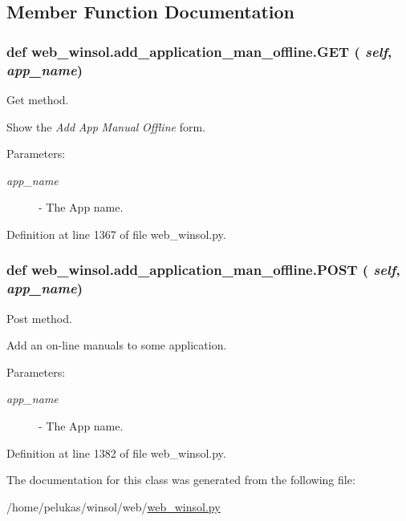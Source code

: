\subsection{Member Function Documentation}
\hypertarget{classweb__winsol_1_1add__application__man__offline_994572f45ede04821775f37da31550ba}{
\subsubsection[GET]{\setlength{\rightskip}{0pt plus 5cm}def web\_\-winsol.add\_\-application\_\-man\_\-offline.GET ( {\em self},  {\em app\_\-name})}}
\label{classweb__winsol_1_1add__application__man__offline_994572f45ede04821775f37da31550ba}


Get method. 

Show the {\em Add\/} {\em App\/} {\em Manual\/} {\em Offline\/} form.

\begin{Desc}
\item[Parameters:]
\begin{description}
\item[{\em app\_\-name}]- The App name. \end{description}
\end{Desc}


Definition at line 1367 of file web\_\-winsol.py.\hypertarget{classweb__winsol_1_1add__application__man__offline_04a20988aa73846dd2ba18e793f858a2}{
\subsubsection[POST]{\setlength{\rightskip}{0pt plus 5cm}def web\_\-winsol.add\_\-application\_\-man\_\-offline.POST ( {\em self},  {\em app\_\-name})}}
\label{classweb__winsol_1_1add__application__man__offline_04a20988aa73846dd2ba18e793f858a2}


Post method. 

Add an on-line manuals to some application.

\begin{Desc}
\item[Parameters:]
\begin{description}
\item[{\em app\_\-name}]- The App name. \end{description}
\end{Desc}


Definition at line 1382 of file web\_\-winsol.py.

The documentation for this class was generated from the following file:\begin{CompactItemize}
\item 
/home/pelukas/winsol/web/\hyperlink{web__winsol_8py}{web\_\-winsol.py}\end{CompactItemize}
